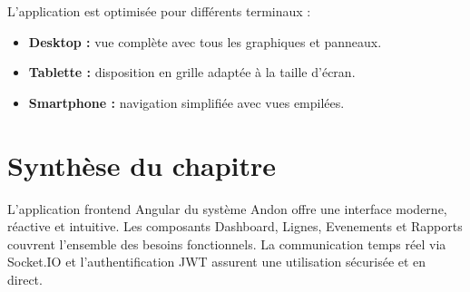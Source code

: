 L'application est optimis\'ee pour diff\'erents terminaux :

\begin{itemize}
    \item \textbf{Desktop :} vue compl\`ete avec tous les graphiques et panneaux.
    \item \textbf{Tablette :} disposition en grille adapt\'ee \`a la taille d'\'ecran.
    \item \textbf{Smartphone :} navigation simplifi\'ee avec vues empil\'ees.
\end{itemize}

\section{Synth\`ese du chapitre}

L'application frontend Angular du syst\`eme Andon offre une interface moderne, r\'eactive et intuitive. Les composants Dashboard, Lignes, Evenements et Rapports couvrent l'ensemble des besoins fonctionnels. La communication temps r\'eel via Socket.IO et l'authentification JWT assurent une utilisation s\'ecuris\'ee et en direct.
